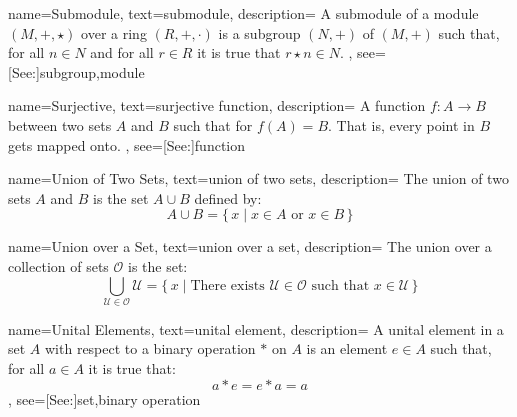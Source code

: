 {
    name={Submodule},
    text={submodule},
    description={
        A submodule of a module $(M,\boldsymbol{+},\star)$ over a ring
        $(R,+,\cdot)$ is a subgroup $(N,\boldsymbol{+})$ of
        $(M,\boldsymbol{+})$ such that, for all $n\in{N}$ and for all $r\in{R}$
        it is true that $r\star{n}\in{N}$.
    },
    see=[See:]{subgroup,module}
}

{
    name={Surjective},
    text={surjective function},
    description={
        A function $f:A\rightarrow{B}$ between two sets $A$ and $B$ such that
        for $f(A)=B$. That is, every point in $B$ gets mapped onto.
    },
    see=[See:]{function}
}

{
    name={Union of Two Sets},
    text={union of two sets},
    description={
            The union of two sets $A$ and $B$ is the set $A\cup{B}$
            defined by:
            \begin{equation*}
                A\cup{B}=\big\{\,x\;|\;x\in{A}\textrm{ or }x\in{B}\,\big\}
            \end{equation*}
    }
}

{
    name={Union over a Set},
    text={union over a set},
    description={
        The union over a collection of sets $\mathcal{O}$ is the set:
        \begin{equation*}
            \bigcup_{\mathcal{U}\in\mathcal{O}}\mathcal{U}
            =\big\{\,x\;|\;\textrm{There exists }\mathcal{U}\in\mathcal{O}
                \textrm{ such that }x\in\mathcal{U}\,\big\}
        \end{equation*}
    }
}

{
    name={Unital Elements},
    text={unital element},
    description={
        A unital element in a set $A$ with respect to a binary operation
        $*$ on $A$ is an element $e\in{A}$ such that, for all $a\in{A}$
        it is true that:
        \begin{equation*}
            a*e=e*a=a
        \end{equation*}
    },
    see=[See:]{set,binary operation}
}




